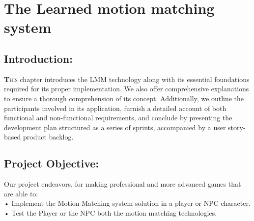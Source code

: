 \documentclass[12pt]{book}
\newenvironment{ConfigureChapter}{
    \centering
        \Centering
        \renewcommand{\thechapter}{\Roman{chapter}}
    }{
    \let\cleardoublepage=\clearpage
    \setcounter{section}{0}
}
\begin{document}

\begin{ConfigureChapter}
    \chapter{\textbf{The Learned motion matching system}}
    \minitoc
\end{ConfigureChapter}
\newpage
\section{Introduction:}
\lettrine[findent=1pt]{\textbf{T}}{his} chapter introduces the LMM technology along with its essential foundations required for its proper implementation. We also offer comprehensive explanations to ensure a thorough comprehension of its concept. Additionally, we outline the participants involved in its application, furnish a detailed account of both functional and non-functional requirements, and conclude by presenting the development plan structured as a series of sprints, accompanied by a user story-based product backlog.

\section{Project Objective:}
Our project endeavors, for making professional and more advanced games that are able to:\\
• Implement the Motion Matching system solution in a player or NPC
character.\\
• Test the Player or the NPC both the motion matching
technologies.\\
\end{document}
